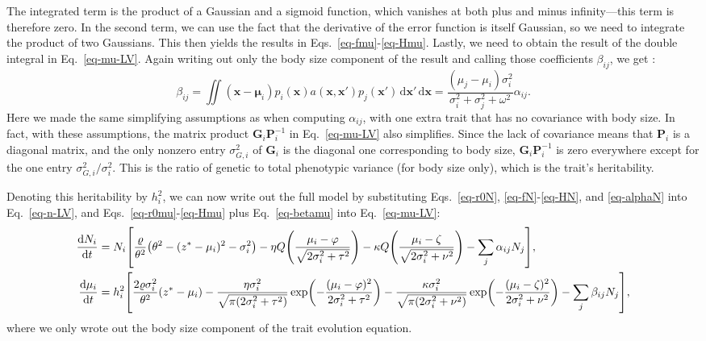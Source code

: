 \documentclass[9pt,twoside,lineno]{pnas-new}
\newcommand{\ud}{\text{d}}
\let\originalleft\left
\let\originalright\right
\renewcommand{\left}{\mathopen{}\mathclose\bgroup\originalleft}
\renewcommand{\right}{\aftergroup\egroup\originalright}
\newcommand{\mat}[1]{\bm{#1}}
\begin{document}
The integrated term is the product of a Gaussian and a sigmoid function, which vanishes at both plus and minus infinity---this term is therefore zero. In the second term, we can use the fact that the derivative of the error function is itself Gaussian, so we need to integrate the product of two Gaussians. This then yields the results in Eqs.~\ref{eq-fmu}-\ref{eq-Hmu}. Lastly, we need to obtain the result of the double integral in Eq.~\ref{eq-mu-LV}. Again writing out only the body size component of the result and calling those coefficients $\beta_{ij}$, we get \cite{Barabasetal2022}:
\begin{equation}
  \label{eq-betamu}
  \beta_{ij}
  = \iint (\mat{x} - \mat{\mu}_i)
  p_i(\mat{x}) a(\mat{x},\mat{x}')
  p_j(\mat{x}')\,\ud\mat{x}'\,\ud\mat{x}
  = \frac{(\mu_j - \mu_i) \sigma_i^2}
  {\sigma_i^2 + \sigma_j^2 + \omega^2} \alpha_{ij} .
\end{equation}
Here we made the same simplifying assumptions as when computing $\alpha_{ij}$, with one extra trait that has no covariance with body size. In fact, with these assumptions, the matrix product $\mat{G}_i \mat{P}_i^{-1}$ in Eq.~\ref{eq-mu-LV} also simplifies. Since the lack of covariance means that $\mat{P}_i$ is a diagonal matrix, and the only nonzero entry $\sigma_{G,i}^2$ of $\mat{G}_i$ is the diagonal one corresponding to body size, $\mat{G}_i \mat{P}_i^{-1}$ is zero everywhere except for the one entry $\sigma_{G,i}^2 / \sigma_i^2$. This is the ratio of genetic to total phenotypic variance (for body size only), which is the trait's heritability.

Denoting this heritability by $h_i^2$, we can now write out the full model by substituting Eqs.~\ref{eq-r0N}, \ref{eq-fN}-\ref{eq-HN}, and \ref{eq-alphaN} into Eq.~\ref{eq-n-LV}, and Eqs.~\ref{eq-r0mu}-\ref{eq-Hmu} plus Eq.~\ref{eq-betamu} into Eq.~\ref{eq-mu-LV}:
\begin{align}
  \label{eq-n-full}
  \frac{\ud N_i}{\ud t}
  &= N_i \left[ \frac{\varrho}{\theta^2}
  \left(\theta^2 - (z^*-\mu_i)^2 - \sigma_i^2 \right)
  - \eta Q\left(\frac{\mu_i-\varphi}
  {\sqrt{2\sigma_i^2+\tau^2}}\right)
  - \kappa Q \left(\frac{\mu_i-\zeta}
  {\sqrt{2\sigma_i^2+\nu^2}}\right)
  - \sum_j \alpha_{ij} N_j \right] , \\
  \label{eq-mu-full}
  \frac{\ud \mu_i}{\ud t}
  &= h_i^2 \left[
  \frac{2\varrho\sigma_i^2}{\theta^2}\left(z^*-\mu_i\right) -
  \frac{\eta\sigma_i^2}{\sqrt{\pi(2\sigma_i^2+\tau^2)}}
  \exp\left( -\frac{(\mu_i-\varphi)^2}{2\sigma_i^2+\tau^2}\right) -
  \frac{\kappa\sigma_i^2}{\sqrt{\pi(2\sigma_i^2+\nu^2)}}
  \exp\left( -\frac{(\mu_i-\zeta)^2}{2\sigma_i^2+\nu^2} \right)
  - \sum_j \beta_{ij} N_j \right] ,
\end{align}
where we only wrote out the body size component of the trait evolution equation.
\end{document}

